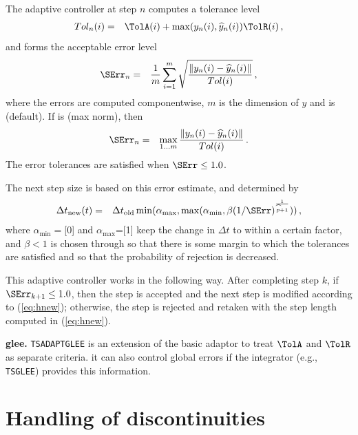 The adaptive controller at step $n$ computes a tolerance level
\begin{eqnarray*}
Tol_n(i)&=&\TolA(i) +  \max(y_n(i),\widehat{y}_n(i)) \TolR(i)\,,
\end{eqnarray*}
and forms the acceptable error level 
\begin{eqnarray*}
\SErr_n&=& \frac{1}{m} \sum_{i=1}^{m}\sqrt{\frac{\left\|y_n(i)
  -\widehat{y}_n(i)\right\|}{Tol(i)}}\,,
\end{eqnarray*}
where the errors are computed componentwise, $m$ is the dimension of
$y$ and  is  (default).
If  is  (max norm), then 
\begin{eqnarray*}
\SErr_n&=& \max_{1\dots m}\frac{\left\|y_n(i)
  -\widehat{y}_n(i)\right\|}{Tol(i)}\,.
\end{eqnarray*}
The error tolerances are satisfied when $\SErr \le 1.0$. 

The next step size is based on this error estimate, and determined by
\begin{eqnarray}
  \label{eq:hnew}
 \Delta t_{\rm new}(t)&=&\Delta t_{\rm{old}} \min(\alpha_{\max},
 \max(\alpha_{\min}, \beta (1/\SErr)^\frac{1}{\widehat{p}+1}))\,,
\end{eqnarray}
where $\alpha_{\min}=$[0] and
$\alpha_{\max}$=[1] keep the change in
$\Delta t$
to within a certain factor, and $\beta<1$ is chosen
through  so that there is 
some margin to which the tolerances are satisfied and so that the
probability of rejection is decreased.

This adaptive controller works in the following way. After completing
step $k$, if $\SErr_{k+1} \le 1.0$, then the step is accepted and the
next step is modified according to (\ref{eq:hnew}); otherwise, the step
is rejected and retaken with the step length computed in (\ref{eq:hnew}).

\noindent\textbf{ glee.} \lstinline{TSADAPTGLEE} is an extension of
the basic adaptor to treat $\TolA$ and $\TolR$ as separate criteria.
it can also control global errors if the integrator (e.g., \lstinline{TSGLEE})
provides this information.

\section{Handling of discontinuities}

